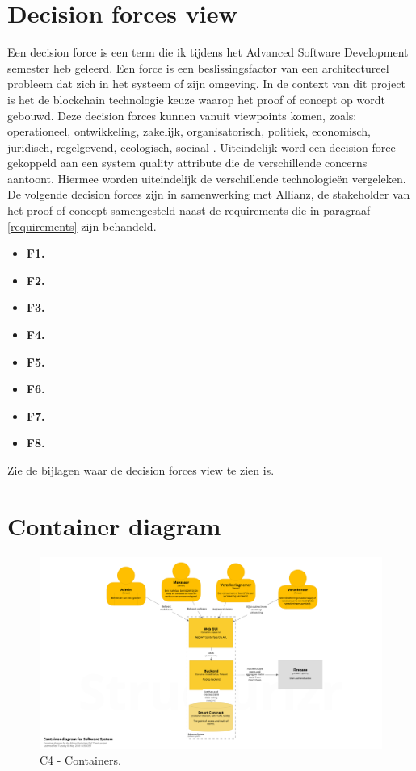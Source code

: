 \newpage

\section{Decision forces view}\label{decisionForcesView}
Een decision force is een term die ik tijdens het Advanced Software Development semester heb geleerd. Een force is een beslissingsfactor van een architectureel probleem dat zich in het systeem of zijn omgeving. In de context van dit project is het de blockchain technologie keuze waarop het proof of concept op wordt gebouwd. Deze decision forces kunnen vanuit viewpoints komen, zoals: operationeel, ontwikkeling, zakelijk, organisatorisch, politiek, economisch, juridisch, regelgevend, ecologisch, sociaal \cite{architectureForces}. Uiteindelijk word een decision force gekoppeld aan een system quality attribute die de verschillende concerns aantoont. Hiermee worden uiteindelijk de verschillende technologieën vergeleken. De volgende decision forces zijn in samenwerking met Allianz, de stakeholder van het proof of concept samengesteld naast de requirements die in paragraaf \ref{requirements} zijn behandeld.

\begin{itemize}
  \item \textbf{F1.} 
  \item \textbf{F2.} 
  \item \textbf{F3.} 
  \item \textbf{F4.} 
  \item \textbf{F5.} 
  \item \textbf{F6.} 
  \item \textbf{F7.} 
  \item \textbf{F8.} 
\end{itemize}

Zie de bijlagen \cite{appendix:decisionForcesView} waar de decision forces view te zien is.

\newpage

\section{Container diagram}

\begin{figure}[h!]
    \begin{center}
        \includegraphics[width=\paperwidth-100]{images/containers}
        \caption{C4 - Containers.}
        \label{fig:c4Containers}
    \end{center}
\end{figure}
